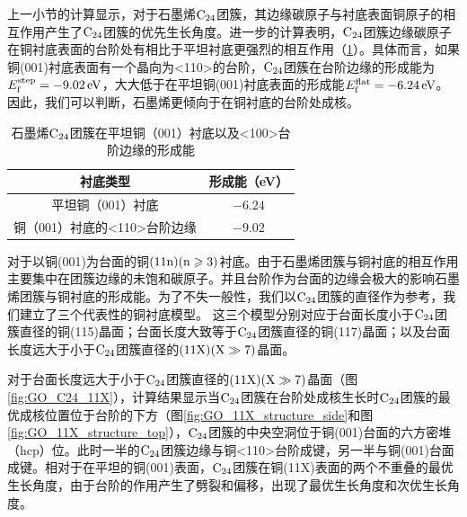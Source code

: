 上一小节的计算显示，对于石墨烯$\rm{C_{24}}$团簇，其边缘碳原子与衬底表面铜原子的相互作用产生了$\rm{C_{24}}$团簇的优先生长角度。进一步的计算表明，$\rm{C_{24}}$团簇边缘碳原子在铜衬底表面的台阶处有相比于平坦衬底更强烈的相互作用（\ref{tab:GO_flat_vs_step}）。具体而言，如果铜(001)衬底表面有一个晶向为<110>的台阶，$\rm{C_{24}}$团簇在台阶边缘的形成能为$E_{\rm f}^{\rm step}=\SI{-9.02}{\electronvolt}$，大大低于在平坦铜(001)衬底表面的形成能$E_{\rm f}^{\rm flat}=\SI{-6.24}{\electronvolt}$。因此，我们可以判断，石墨烯更倾向于在铜衬底的台阶处成核。

\begin{table}
    \centering
    \caption{石墨烯$\rm{C_{24}}$团簇在平坦铜（001）衬底以及<100>台阶边缘的形成能}
    \begin{tabular}{cc}
        \toprule
        衬底类型                     & 形成能（\si{\electronvolt}） \\
        \midrule
        平坦铜（001）衬底            & $-6.24$                      \\
        铜（001）衬底的<110>台阶边缘 & $-9.02$                      \\
        \bottomrule
    \end{tabular}
    \label{tab:GO_flat_vs_step}
\end{table}

对于以铜(001)为台面的铜$\rm{(11n)(n \geqslant 3)}$衬底。由于石墨烯团簇与铜衬底的相互作用主要集中在团簇边缘的未饱和碳原子。并且台阶作为台面的边缘会极大的影响石墨烯团簇与铜衬底的形成能。为了不失一般性，我们以$\rm{C_{24}}$团簇的直径作为参考，我们建立了三个代表性的铜衬底模型。
这三个模型分别对应于台面长度小于$\rm{C_{24}}$团簇直径的铜(115)晶面；台面长度大致等于$\rm{C_{24}}$团簇直径的铜(117)晶面；以及台面长度远大于小于$\rm{C_{24}}$团簇直径的$\rm (11X)(X \gg 7 )$晶面。

对于台面长度远大于小于$\rm{C_{24}}$团簇直径的$\rm (11X)(X \gg 7 )$晶面（图\ref{fig:GO_C24_11X}），计算结果显示当$\rm{C_{24}}$团簇在台阶处成核生长时$\rm{C_{24}}$团簇的最优成核位置位于台阶的下方（图\ref{fig:GO_11X_structure_side}和图\ref{fig:GO_11X_structure_top}），$\rm{C_{24}}$团簇的中央空洞位于铜(001)台面的六方密堆（hcp）位。此时一半的$\rm{C_{24}}$团簇边缘与铜<110>台阶成键，另一半与铜(001)台面成键。相对于在平坦的铜(001)表面，$\rm{C_{24}}$团簇在铜(11X)表面的两个不重叠的最优生长角度，由于台阶的作用产生了劈裂和偏移，出现了最优生长角度和次优生长角度。

